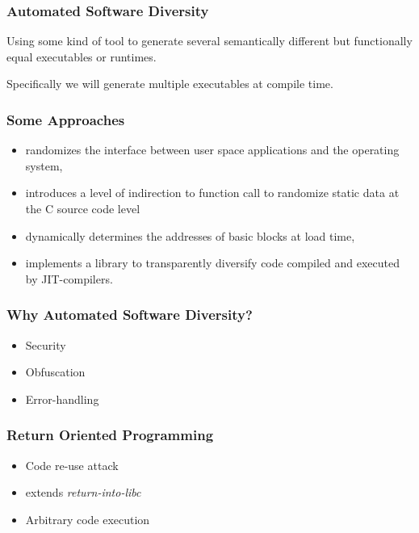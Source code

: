 \begin{frame}
	\frametitle{Automated Software Diversity}

	Using some kind of tool to generate several semantically different but functionally
	equal executables or runtimes.

	\vspace{0.5cm}

	Specifically we will generate multiple executables at compile time.

\end{frame}

\begin{frame}
	\frametitle{Some Approaches}

	\begin{itemize}
		\item \textcite{os-randomization}
randomizes the interface between user space applications and the operating system,
		\item \textcite{mem-exploits} introduces a level of indirection to function call to
			randomize static data at the C source code level
		\item \textcite{binary-stirring} dynamically determines the addresses of basic blocks
			at load time,
		\item \textcite{librando} implements a library to transparently diversify code compiled
			and executed by JIT-compilers.
	\end{itemize}

\end{frame}

\begin{frame}
	\frametitle{Why Automated Software Diversity?}

	\begin{itemize}
		\item Security
		\item Obfuscation
		\item	Error-handling
	\end{itemize}

\end{frame}


\begin{frame}
	\frametitle{Return Oriented Programming}
		\begin{itemize}
			\item Code re-use attack
			\item extends \textit{return-into-libc}
			\item Arbitrary code execution
		\end{itemize}
\end{frame}


